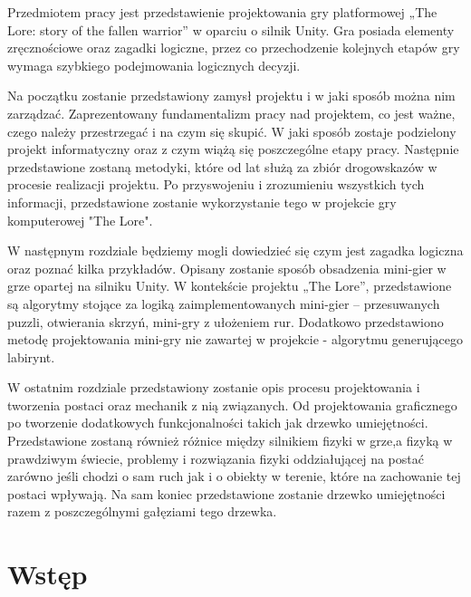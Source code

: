 \documentclass[oneside,polski,logo]{amuthesis}
\begin{document}
\begin{streszczenie}
Przedmiotem pracy jest przedstawienie projektowania gry platformowej „The Lore: story of the fallen warrior” w oparciu o silnik Unity. Gra posiada elementy zręcznościowe oraz zagadki logiczne, przez co przechodzenie kolejnych etapów gry wymaga szybkiego podejmowania logicznych decyzji. \par
Na początku zostanie przedstawiony zamysł projektu i w jaki sposób można nim zarządzać. Zaprezentowany fundamentalizm pracy nad projektem, co jest ważne, czego należy przestrzegać i na czym się skupić. W jaki sposób zostaje podzielony projekt informatyczny oraz z czym wiążą się poszczególne etapy pracy. Następnie przedstawione zostaną metodyki, które od lat służą za zbiór drogowskazów w procesie realizacji projektu. Po przyswojeniu i zrozumieniu wszystkich tych informacji, przedstawione zostanie wykorzystanie tego w projekcie gry komputerowej "The Lore". \par
W następnym rozdziale będziemy mogli dowiedzieć się czym jest zagadka logiczna oraz poznać kilka przykładów. Opisany zostanie sposób obsadzenia mini-gier w grze opartej na silniku Unity. W kontekście projektu „The Lore”, przedstawione są algorytmy stojące za logiką zaimplementowanych mini-gier – przesuwanych puzzli, otwierania skrzyń, mini-gry z ułożeniem rur. Dodatkowo przedstawiono metodę projektowania mini-gry nie zawartej w projekcie - algorytmu generującego labirynt. \par
W ostatnim rozdziale przedstawiony zostanie opis procesu projektowania i tworzenia postaci oraz mechanik z nią związanych. Od projektowania graficznego po tworzenie dodatkowych funkcjonalności takich jak drzewko umiejętności. Przedstawione zostaną również różnice między silnikiem fizyki w grze,a  fizyką w prawdziwym świecie, problemy i rozwiązania fizyki oddziałującej na postać zarówno jeśli chodzi o sam ruch jak i o obiekty w terenie, które na zachowanie tej postaci wpływają. Na sam koniec przedstawione zostanie drzewko umiejętności razem z poszczególnymi gałęziami tego drzewka.

\end{streszczenie}
\tableofcontents




\chapter{Wstęp}
\end{document}
